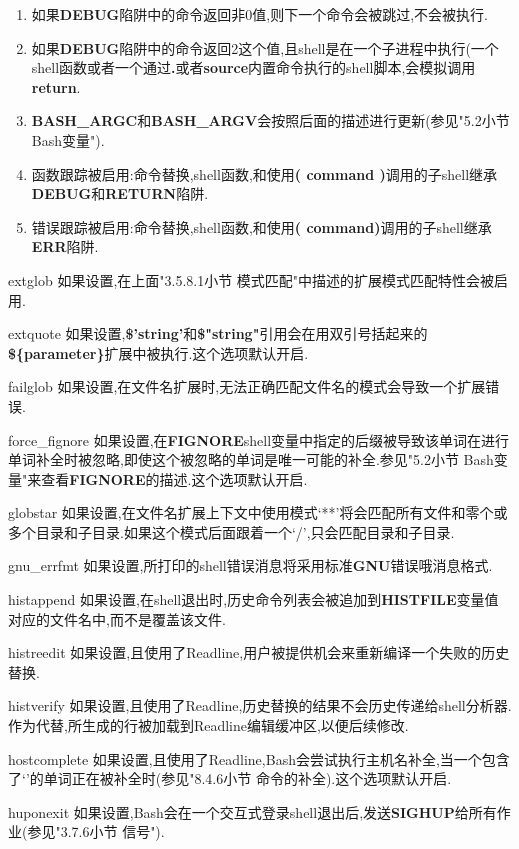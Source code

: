 \documentclass[draft,openany]{book}
\begin{document}
\begin{CJK}{UTF8}{gbsn}
\begin{basedescript}{\desclabelstyle{\nextlinelabel}\desclabelwidth{2.5em}}
\begin{enumerate}
            \item 如果\textbf{DEBUG}陷阱中的命令返回非0值,则下一个命令会被跳过,不会被执行.
        \item 如果\textbf{DEBUG}陷阱中的命令返回2这个值,且shell是在一个子进程中执行(一个shell函数或者一个通过\textbf{.}或者\textbf{source}内置命令执行的shell脚本,会模拟调用\textbf{return}.
        \item \textbf{BASH\_ARGC}和\textbf{BASH\_ARGV}会按照后面的描述进行更新(参见"5.2小节 Bash变量").
        \item 函数跟踪被启用:命令替换,shell函数,和使用\textbf{( command )}调用的子shell继承\textbf{DEBUG}和\textbf{RETURN}陷阱.
        \item 错误跟踪被启用:命令替换,shell函数,和使用\textbf{( command)}调用的子shell继承\textbf{ERR}陷阱.
        \end{enumerate}
    \item[extglob] 如果设置,在上面"3.5.8.1小节 模式匹配"中描述的扩展模式匹配特性会被启用.
    \item[extquote] 如果设置,\textbf{\$'string'}和\textbf{\$"string"}引用会在用双引号括起来的\textbf{\$\{parameter\}}扩展中被执行.这个选项默认开启.
    \item[failglob] 如果设置,在文件名扩展时,无法正确匹配文件名的模式会导致一个扩展错误.
    \item[force\_fignore] 如果设置,在\textbf{FIGNORE}shell变量中指定的后缀被导致该单词在进行单词补全时被忽略,即使这个被忽略的单词是唯一可能的补全.参见"5.2小节 Bash变量"来查看\textbf{FIGNORE}的描述.这个选项默认开启.
    \item[globstar] 如果设置,在文件名扩展上下文中使用模式`**'将会匹配所有文件和零个或多个目录和子目录.如果这个模式后面跟着一个`/',只会匹配目录和子目录.
    \item[gnu\_errfmt] 如果设置,所打印的shell错误消息将采用标准\textbf{GNU}错误哦消息格式.
    \item[histappend] 如果设置,在shell退出时,历史命令列表会被追加到\textbf{HISTFILE}变量值对应的文件名中,而不是覆盖该文件.
    \item[histreedit] 如果设置,且使用了Readline,用户被提供机会来重新编译一个失败的历史替换.
    \item[histverify] 如果设置,且使用了Readline,历史替换的结果不会历史传递给shell分析器.作为代替,所生成的行被加载到Readline编辑缓冲区,以便后续修改.
    \item[hostcomplete] 如果设置,且使用了Readline,Bash会尝试执行主机名补全,当一个包含了`\@'的单词正在被补全时(参见"8.4.6小节 命令的补全).这个选项默认开启.
    \item[huponexit] 如果设置,Bash会在一个交互式登录shell退出后,发送\textbf{SIGHUP}给所有作业(参见"3.7.6小节 信号").

\end{basedescript}
\end{CJK}
\end{document}
